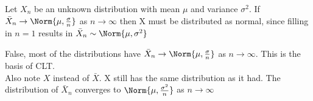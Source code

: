\documentclass[tf-tutorial-all.tex]{subfiles}
\begin{document}
\begin{truefalse}
Let $X_{n}$ be an unknown distribution with mean $\mu $ and variance $\sigma^{2}$. If $\bar{X}_{n} \to \Norm{\mu, \frac{\sigma}{n}}$ as $n \to \infty$
then X must be distributed as normal, since filling in $ n=1 $ results in $\bar{X}_{n} \sim \Norm{\mu, \sigma^{2}}$
\begin{solution}
False, most of the distributions have $\bar{X}_{n} \to \Norm{\mu, \frac{\sigma}{n}}$ as $n \to \infty$. This is the basis of CLT. 
\\Also note $X $ instead of $\bar{X}$. X still has the same distribution as it had. The distribution of $\bar{X}_{n}$ converges to $\Norm{\mu, \frac{\sigma^{2}}{n}} $ as $n \to \infty$

\end{solution}
\end{truefalse}
\end{document}
